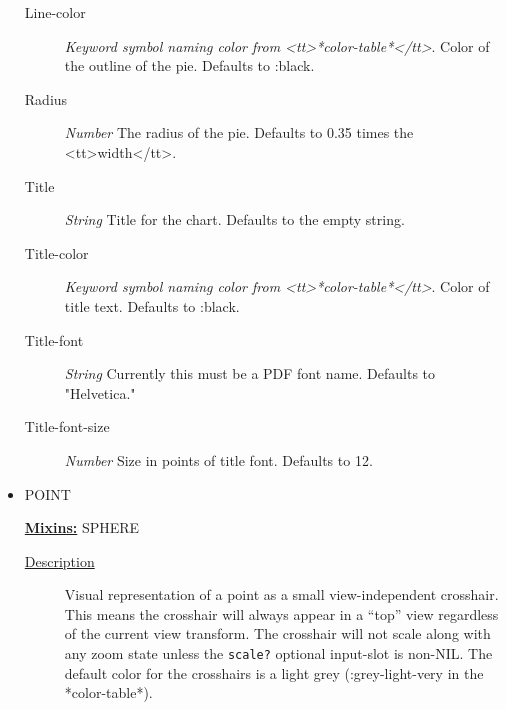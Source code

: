 \documentclass [11pt]{book}
\begin{document}
\begin{itemize}
\begin{description}
\item [Line-color]
\emph{Keyword symbol naming color from <tt>*color-table*</tt>}.
Color of the outline of the pie. Defaults to :black.


\item [Radius]
\emph{Number} The radius of the pie. Defaults to 0.35 times the <tt>width</tt>.


\item [Title]
\emph{String} Title for the chart. Defaults to the empty string.


\item [Title-color]
\emph{Keyword symbol naming color from <tt>*color-table*</tt>}.
Color of title text. Defaults to :black.


\item [Title-font]
\emph{String} Currently this must be a PDF font name. Defaults to "Helvetica."


\item [Title-font-size]
\emph{Number} Size in points of title font. Defaults to 12.


\end{description}







\item {}POINT


\textbf{
\underline{Mixins:}} SPHERE





\begin{description}

\item [
\underline{Description}]


Visual representation of a point as a small view-independent crosshair. This means
the crosshair will always appear in a ``top'' view regardless of the current view transform. The crosshair will
not scale along with any zoom state unless the \texttt{scale?} optional input-slot is non-NIL. The default
color for the crosshairs is a light grey (:grey-light-very in the *color-table*).



\end{description}





\end{itemize}
\end{document}
